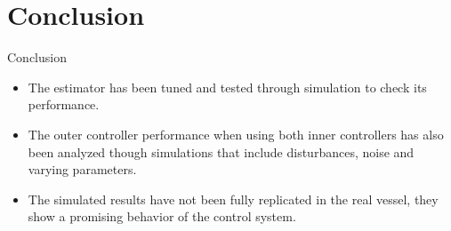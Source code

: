 \section{Conclusion}

\begin{frame}{Conclusion}{}
    \begin{itemize}
        \item The estimator has been tuned and tested through simulation to check its performance.
        \item The outer controller performance when using both inner controllers has also been analyzed though simulations that include disturbances, noise and varying parameters.
        \item The simulated results have not been fully replicated in the real vessel, they show a promising behavior of the control system.
    \end{itemize}
\end{frame}
